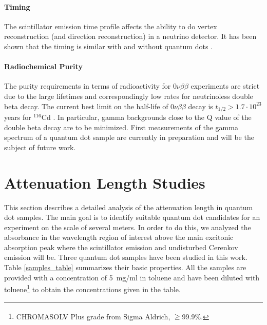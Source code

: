\documentclass[cits]{JINST}
\begin{document}
\paragraph{Timing}
The scintillator emission time profile affects the ability to do vertex reconstruction (and direction reconstruction) in a neutrino detector. It has been shown that the timing is similar with and without quantum dots \cite{mitpaper}. 

\paragraph{Radiochemical Purity}
The purity requirements in terms of radioactivity for 0$\nu\beta\beta$ experiments are strict due to the large lifetimes and correspondingly low rates for neutrinoless double beta decay. The current best limit on the half-life of 0$\nu\beta\beta$ decay is $t_{1/2}>1.7\cdot10^{23}$ years for $^{116}$Cd \cite{solotvina}. In particular, gamma backgrounds close to the Q value of the double beta decay are to be minimized. First measurements of the gamma spectrum of a quantum dot sample are currently in preparation and will be the subject of future work.   


\section{Attenuation Length Studies}\label{Attenuation_length_section}
This section describes a detailed analysis of the attenuation length in quantum dot samples. The main goal is to identify suitable quantum dot candidates for an experiment on the scale of several meters. In order to do this, we analyzed the absorbance in the wavelength region of interest above the main excitonic absorption peak where the scintillator emission and undisturbed Cerenkov emission will be. Three quantum dot samples have been studied in this work. Table \ref{samples_table} summarizes their basic properties. All the samples are provided with a concentration of 5~mg/ml in toluene and have been diluted with toluene\footnote{CHROMASOLV\textsuperscript{\textregistered} Plus grade from Sigma Aldrich, $\geq$99.9\%.} to obtain the concentrations given in the table. 
\end{document}
